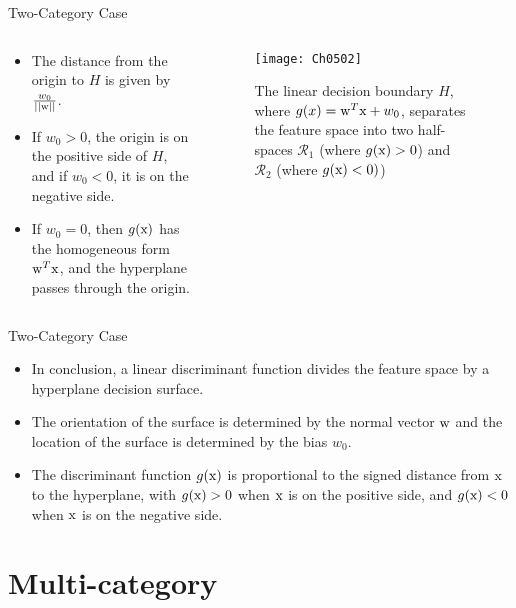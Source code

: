 \begin{frame}{Two-Category Case}
\begin{columns}
\begin{column}{6cm}
\begin{itemize}
\item The distance from the origin to $H$ is given by $\frac{w_0}{||{\rm w}||}$. 
\vspace{10pt}
\item If $w_0>0$, the origin is on the positive side of $H$, and if $w_0<0$, it is on the negative side.
\vspace{10pt}
\item If $w_0 = 0$, then $g({\rm x})$ has the homogeneous form ${\rm w}^T{\rm x}$, and the hyperplane passes through the
origin.
\end{itemize}
\end{column}
\begin{column}{7.5cm}
\vspace{-6pt}
\begin{figure}
\texttt{[image: Ch0502]}
\caption{The linear decision boundary $H$, where $g(x)={\rm w}^T{\rm x}+w_0$, separates the feature space into two half-spaces $\mathcal{R}_1$ (where $g({\rm  x})>0$) and $\mathcal{R}_2$ (where $g({\rm x})<0)$)}
\end{figure}
\end{column}
\end{columns}
\end{frame}

\begin{frame}{Two-Category Case}
\begin{itemize}
\item In conclusion, a linear discriminant function divides the feature space by a hyperplane decision surface.
\item The orientation of the surface is determined by the normal vector ${\rm w}$ and the location of the surface is determined by the bias $w_0$.
\item The discriminant function $g({\rm x})$ is proportional to the signed distance from ${\rm x}$ to the hyperplane, with $g({\rm x})>0$ when ${\rm x}$ is on the positive side, and $g({\rm x})<0$ when ${\rm x}$ is on the negative side.
\end{itemize}
\end{frame}

\section{Multi-category}
